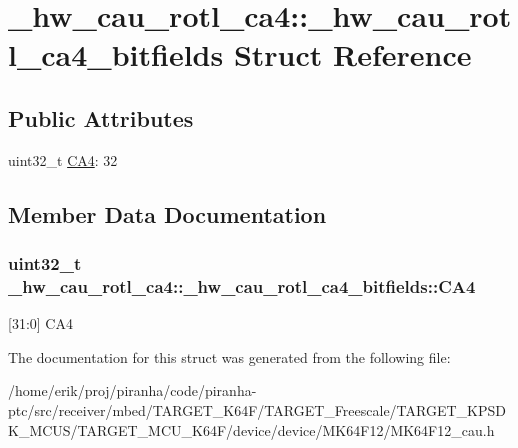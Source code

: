 \hypertarget{struct__hw__cau__rotl__ca4_1_1__hw__cau__rotl__ca4__bitfields}{}\section{\+\_\+hw\+\_\+cau\+\_\+rotl\+\_\+ca4\+:\+:\+\_\+hw\+\_\+cau\+\_\+rotl\+\_\+ca4\+\_\+bitfields Struct Reference}
\label{struct__hw__cau__rotl__ca4_1_1__hw__cau__rotl__ca4__bitfields}
\subsection*{Public Attributes}
\begin{DoxyCompactItemize}
\item 
uint32\+\_\+t \hyperlink{struct__hw__cau__rotl__ca4_1_1__hw__cau__rotl__ca4__bitfields_a263175197e909f7486cdae5624219e54}{C\+A4}\+: 32
\end{DoxyCompactItemize}


\subsection{Member Data Documentation}
\subsubsection[{\texorpdfstring{C\+A4}{CA4}}]{\setlength{\rightskip}{0pt plus 5cm}uint32\+\_\+t \+\_\+hw\+\_\+cau\+\_\+rotl\+\_\+ca4\+::\+\_\+hw\+\_\+cau\+\_\+rotl\+\_\+ca4\+\_\+bitfields\+::\+C\+A4}\hypertarget{struct__hw__cau__rotl__ca4_1_1__hw__cau__rotl__ca4__bitfields_a263175197e909f7486cdae5624219e54}{}\label{struct__hw__cau__rotl__ca4_1_1__hw__cau__rotl__ca4__bitfields_a263175197e909f7486cdae5624219e54}
\mbox{[}31\+:0\mbox{]} C\+A4 

The documentation for this struct was generated from the following file\+:\begin{DoxyCompactItemize}
\item 
/home/erik/proj/piranha/code/piranha-\/ptc/src/receiver/mbed/\+T\+A\+R\+G\+E\+T\+\_\+\+K64\+F/\+T\+A\+R\+G\+E\+T\+\_\+\+Freescale/\+T\+A\+R\+G\+E\+T\+\_\+\+K\+P\+S\+D\+K\+\_\+\+M\+C\+U\+S/\+T\+A\+R\+G\+E\+T\+\_\+\+M\+C\+U\+\_\+\+K64\+F/device/device/\+M\+K64\+F12/M\+K64\+F12\+\_\+cau.\+h\end{DoxyCompactItemize}
